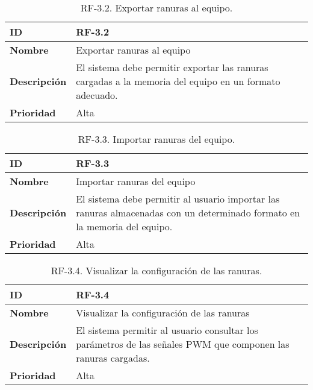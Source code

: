 \begin{table}[h!]
    \centering
    \begin{tabular}{|m{2.5cm}|m{9.27cm}|}
        \hline
        \textbf{ID} & RF-3.2 \\
        \hline
        \textbf{Nombre} & Exportar ranuras al equipo \\
        \hline
        \textbf{Descripción} & El sistema debe permitir exportar las ranuras cargadas a la memoria del equipo en un formato adecuado. \\
        \hline
        \textbf{Prioridad} & Alta \\
        \hline
    \end{tabular}
    \caption{RF-3.2. Exportar ranuras al equipo.}
\end{table}

\begin{table}[h!]
    \centering
    \begin{tabular}{|m{2.5cm}|m{9.27cm}|}
        \hline
        \textbf{ID} & RF-3.3 \\
        \hline
        \textbf{Nombre} & Importar ranuras del equipo \\
        \hline
        \textbf{Descripción} & El sistema debe permitir al usuario importar las ranuras almacenadas con un determinado formato en la memoria del equipo. \\
        \hline
        \textbf{Prioridad} & Alta \\
        \hline
    \end{tabular}
    \caption{RF-3.3. Importar ranuras del equipo.}
\end{table}

\begin{table}[h!]
    \centering
    \begin{tabular}{|m{2.5cm}|m{9.27cm}|}
        \hline
        \textbf{ID} & RF-3.4 \\
        \hline
        \textbf{Nombre} & Visualizar la configuración de las ranuras \\
        \hline
        \textbf{Descripción} & El sistema permitir al usuario consultar los parámetros de las señales PWM que componen las ranuras cargadas. \\
        \hline
        \textbf{Prioridad} & Alta \\
        \hline
    \end{tabular}
    \caption{RF-3.4. Visualizar la configuración de las ranuras.}
\end{table}

